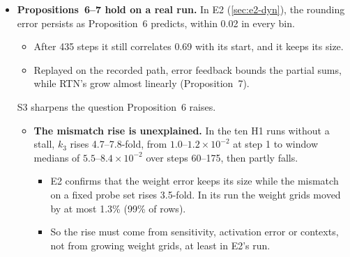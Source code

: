 \documentclass[11pt]{article}
\begin{document}
\begin{itemize}
\begin{itemize}
\begin{itemize}
    \item In policy space the rollout follows the trainer with slope 0.93 over the run and never comes near freezing. The registered $\pm10\%$ test fails in 2 of 11 checks: one cumulative pair at 0.8985, and the pooled one-step slope, 1.17, which comes from the last pair.
    \end{itemize}
  \item \textbf{Assumption~U} (\cref{sec:e2-results,sec:e2-dyn}).
    \begin{itemize}
    \item On the stored checkpoints the rounding phase is uniform at the boundary to within 1.5\% in all three models, and Lemma~1's condition holds in every row. In the bulk, BF16 storage leaves deviations of up to 5.2\%, one of them above the registered limit of 5\%.
    \item During the run the bulk deviation falls from 0.036 to 0.001 as the weights leave the BF16 lattice.
    \item At the scale of one update the lattice matters, for the first update only.
    \end{itemize}
  \end{itemize}
\item \textbf{Propositions~6--7 hold on a real run.} In E2 (\cref{sec:e2-dyn}), the rounding error persists as Proposition~6 predicts, within 0.02 in every bin.
  \begin{itemize}
  \item After 435 steps it still correlates 0.69 with its start, and it keeps its size.
  \item Replayed on the recorded path, error feedback bounds the partial sums, while RTN's grow almost linearly (Proposition~7).
  \end{itemize}
  S3 sharpens the question Proposition~6 raises.
  \begin{itemize}
  \item \textbf{The mismatch rise is unexplained.} In the ten H1 runs without a stall, $k_3$ rises 4.7--7.8-fold, from $1.0$--$1.2\times10^{-2}$ at step 1 to window medians of $5.5$--$8.4\times10^{-2}$ over steps 60--175, then partly falls.
    \begin{itemize}
    \item E2 confirms that the weight error keeps its size while the mismatch on a fixed probe set rises 3.5-fold. In its run the weight grids moved by at most 1.3\% (99\% of rows).
    \item So the rise must come from sensitivity, activation error or contexts, not from growing weight grids, at least in E2's run.

\end{itemize}
\end{itemize}
\end{itemize}
\end{document}
